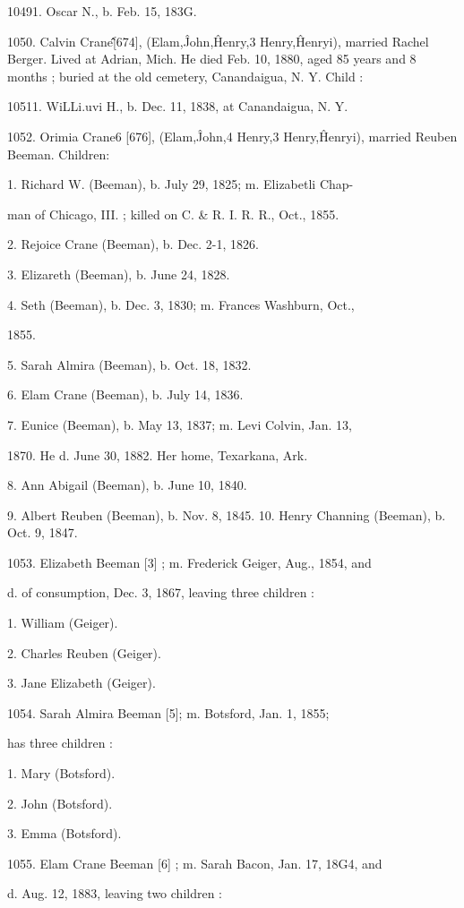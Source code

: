 10491. Oscar N., b. Feb. 15, 183G. 

1050. Calvin Crane\^\^ [674], (Elam,\^ John,\^ Henry,3 Henry,\^ 
Henryi), married Rachel Berger. Lived at Adrian, Mich. He 
died Feb. 10, 1880, aged 85 years and 8 months ; buried at the 
old cemetery, Canandaigua, N. Y. Child : 

10511. WiLLi.uvi H., b. Dec. 11, 1838, at Canandaigua, N. Y. 

1052. Orimia Crane6 [676], (Elam,\^ John,4 Henry,3 Henry,\^ 
Henryi), married Reuben Beeman. Children: 

1. Richard W. (Beeman), b. July 29, 1825; m. Elizabetli Chap- 

man of Chicago, III. ; killed on C. \& R. I. R. R., Oct., 1855. 

2. Rejoice Crane (Beeman), b. Dec. 2-1, 1826. 

3. Elizareth (Beeman), b. June 24, 1828. 

4. Seth (Beeman), b. Dec. 3, 1830; m. Frances Washburn, Oct., 

1855. 

5. Sarah Almira (Beeman), b. Oct. 18, 1832. 

6. Elam Crane (Beeman), b. July 14, 1836. 

7. Eunice (Beeman), b. May 13, 1837; m. Levi Colvin, Jan. 13, 

1870. He d. June 30, 1882. Her home, Texarkana, Ark. 

8. Ann Abigail (Beeman), b. June 10, 1840. 

9. Albert Reuben (Beeman), b. Nov. 8, 1845. 
10. Henry Channing (Beeman), b. Oct. 9, 1847. 

1053. Elizabeth Beeman [3] ; m. Frederick Geiger, Aug., 1854, and 

d. of consumption, Dec. 3, 1867, leaving three children : 

1. William (Geiger). 

2. Charles Reuben (Geiger). 

3. Jane Elizabeth (Geiger). 

1054. Sarah Almira Beeman [5]; m. Botsford, Jan. 1, 1855; 

has three children : 

1. Mary (Botsford). 

2. John (Botsford). 

3. Emma (Botsford). 

1055. Elam Crane Beeman [6] ; m. Sarah Bacon, Jan. 17, 18G4, and 

d. Aug. 12, 1883, leaving two children : 

